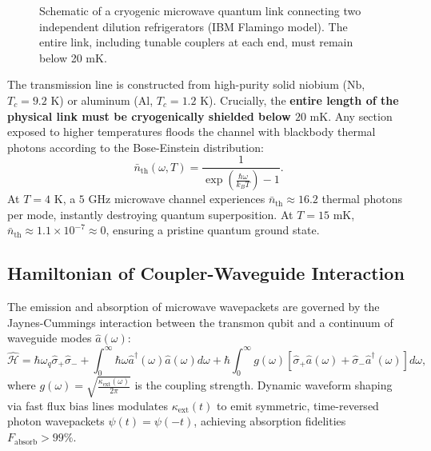 \begin{figure}[htbp]
    \caption{Schematic of a cryogenic microwave quantum link connecting two independent dilution refrigerators (IBM Flamingo model). The entire link, including tunable couplers at each end, must remain below 20 mK.}
    \label{fig:superconducting_link_full}
\end{figure}

The transmission line is constructed from high-purity solid niobium ($\text{Nb}$, $T_c = 9.2\text{ K}$) or aluminum ($\text{Al}$, $T_c = 1.2\text{ K}$). Crucially, the \textbf{entire length of the physical link must be cryogenically shielded below $20\text{ mK}$}. Any section exposed to higher temperatures floods the channel with blackbody thermal photons according to the Bose-Einstein distribution:
\begin{equation}
    \bar{n}_{\text{th}}(\omega, T) = \frac{1}{\exp\left(\frac{\hbar \omega}{k_B T}\right) - 1}.
    \label{eq:bose_einstein_thermal_photons}
\end{equation}
At $T = 4\text{ K}$, a $5\text{ GHz}$ microwave channel experiences $\bar{n}_{\text{th}} \approx 16.2$ thermal photons per mode, instantly destroying quantum superposition. At $T = 15\text{ mK}$, $\bar{n}_{\text{th}} \approx 1.1 \times 10^{-7} \approx 0$, ensuring a pristine quantum ground state.

\subsection{Hamiltonian of Coupler-Waveguide Interaction}
The emission and absorption of microwave wavepackets are governed by the Jaynes-Cummings interaction between the transmon qubit and a continuum of waveguide modes $\hat{a}(\omega)$:
\begin{equation}
    \hat{\mathcal{H}} = \hbar \omega_q \hat{\sigma}_+ \hat{\sigma}_- + \int_{0}^{\infty} \hbar \omega \hat{a}^\dagger(\omega) \hat{a}(\omega) d\omega + \hbar \int_{0}^{\infty} g(\omega) \left[ \hat{\sigma}_+ \hat{a}(\omega) + \hat{\sigma}_- \hat{a}^\dagger(\omega) \right] d\omega,
    \label{eq:waveguide_continuum_hamiltonian}
\end{equation}
where $g(\omega) = \sqrt{\frac{\kappa_{\text{ext}}(\omega)}{2\pi}}$ is the coupling strength. Dynamic waveform shaping via fast flux bias lines modulates $\kappa_{\text{ext}}(t)$ to emit symmetric, time-reversed photon wavepackets $\psi(t) = \psi(-t)$, achieving absorption fidelities $F_{\text{absorb}} > 99\%$.


